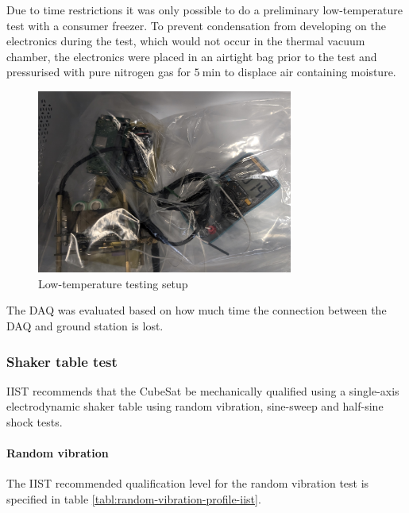\documentclass[a4paper,11pt]{article}
\begin{document}
Due to time restrictions it was only possible to do a preliminary low-temperature test with a consumer freezer. To prevent condensation from developing on the electronics during the test, which would not occur in the thermal vacuum chamber, the electronics were placed in an airtight bag prior to the test and pressurised with pure nitrogen gas for $\SI{5}{\minute}$ to displace air containing moisture.

\begin{figure}[H]
  \centering
  \includegraphics[width=0.75\textwidth]{images/fridge_test.jpg}
  \caption{Low-temperature testing setup}
  \label{fig:temperature-testing-fridge}
\end{figure}

The DAQ was evaluated based on how much time the connection between the DAQ and ground station is lost.

\subsubsection{Shaker table test}  \label{sec:shaker-table-test}

IIST recommends that the CubeSat be mechanically qualified using a single-axis electrodynamic shaker table using random vibration, sine-sweep and half-sine shock tests. 

\paragraph{Random vibration}

The IIST recommended qualification level for the random vibration test is specified in table \ref{tabl:random-vibration-profile-iist}.
\end{document}
